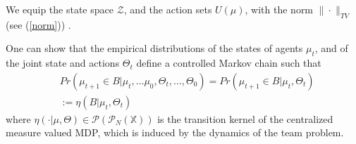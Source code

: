 \documentclass[twoside,11pt]{article}
\def\B{{\mathcal B}}
\def\P{{\mathcal P}}
\begin{document}
We equip the state space $\mathcal{Z}$, and the action sets $U(\mu)$, with the norm $\| \cdot\|_{TV}$ (see (\ref{norm}))  .




One can show that \cite{bayraktar2023finite, bayraktar2023infinite} the empirical distributions of the states of agents $\mu_t$, and of the joint state and actions $\Theta_t$ define a controlled Markov chain such that
\begin{align}\label{trans_measure}
&Pr(\mu_{t+1}\in B|\mu_t,\dots\mu_0,\Theta_t,\dots,\Theta_0)=Pr(\mu_{t+1}\in B|\mu_t,\Theta_t)\nonumber\\
&:=\eta(B|\mu_t,\Theta_t)
\end{align}
where $\eta(\cdot|\mu,\Theta)\in \P(\P_N(\mathds{X}))$ is the transition kernel of the centralized measure valued MDP, which is induced by the dynamics of the team problem.
\end{document}
